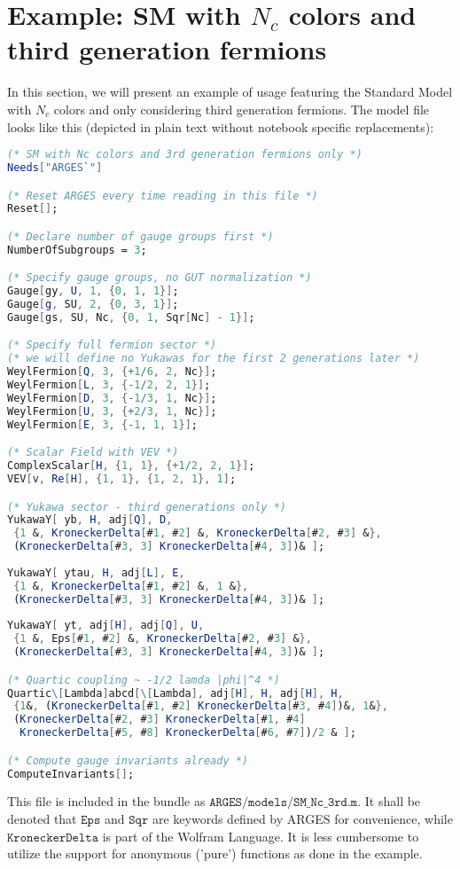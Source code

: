 \documentclass{scrartcl}
\begin{document}
\section{Example: SM with $N_c$ colors and third generation fermions}
In this section, we will present an example of usage featuring the Standard Model with $N_c$ colors and only considering third generation fermions. The model file looks like this (depicted in plain text without notebook specific replacements):
\begin{lstlisting}[language=mathematica,mathescape,columns=flexible,backgroundcolor=\color{light-gray}]
(* SM with Nc colors and 3rd generation fermions only *)
Needs["ARGES`"]

(* Reset ARGES every time reading in this file *)
Reset[];

(* Declare number of gauge groups first *)
NumberOfSubgroups = 3;

(* Specify gauge groups, no GUT normalization *)
Gauge[gy, U, 1, {0, 1, 1}];
Gauge[g, SU, 2, {0, 3, 1}];
Gauge[gs, SU, Nc, {0, 1, Sqr[Nc] - 1}];

(* Specify full fermion sector *)
(* we will define no Yukawas for the first 2 generations later *)
WeylFermion[Q, 3, {+1/6, 2, Nc}];
WeylFermion[L, 3, {-1/2, 2, 1}];
WeylFermion[D, 3, {-1/3, 1, Nc}];
WeylFermion[U, 3, {+2/3, 1, Nc}];
WeylFermion[E, 3, {-1, 1, 1}];

(* Scalar Field with VEV *)
ComplexScalar[H, {1, 1}, {+1/2, 2, 1}];
VEV[v, Re[H], {1, 1}, {1, 2, 1}, 1];

(* Yukawa sector - third generations only *)
YukawaY[ yb, H, adj[Q], D, 
 {1 &, KroneckerDelta[#1, #2] &, KroneckerDelta[#2, #3] &}, 
 (KroneckerDelta[#3, 3] KroneckerDelta[#4, 3])& ];
 
YukawaY[ ytau, H, adj[L], E, 
 {1 &, KroneckerDelta[#1, #2] &, 1 &}, 
 (KroneckerDelta[#3, 3] KroneckerDelta[#4, 3])& ];
 
YukawaY[ yt, adj[H], adj[Q], U, 
 {1 &, Eps[#1, #2] &, KroneckerDelta[#2, #3] &},
 (KroneckerDelta[#3, 3] KroneckerDelta[#4, 3])& ];

(* Quartic coupling ~ -1/2 lamda |phi|^4 *)
Quartic\[Lambda]abcd[\[Lambda], adj[H], H, adj[H], H, 
 {1&, (KroneckerDelta[#1, #2] KroneckerDelta[#3, #4])&, 1&}, 
 (KroneckerDelta[#2, #3] KroneckerDelta[#1, #4] 
  KroneckerDelta[#5, #8] KroneckerDelta[#6, #7])/2 & ];

(* Compute gauge invariants already *)
ComputeInvariants[];
\end{lstlisting}
This file is included in the bundle as $\mathtt{ARGES/models/SM\_Nc\_3rd.m}$. It shall be denoted that $\mathtt{Eps}$ and $\mathtt{Sqr}$ are keywords defined by ARGES for convenience, while $\mathtt{KroneckerDelta}$ is part of the Wolfram Language. It is less cumbersome to utilize the support for anonymous ('pure') functions as done in the example.
\end{document}
